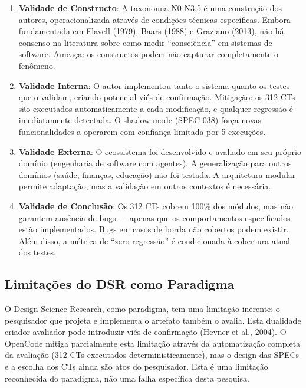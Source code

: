 \begin{enumerate}
    \item \textbf{Validade de Constructo}: A taxonomia N0-N3.5 é uma construção dos autores, operacionalizada através de condições técnicas específicas. Embora fundamentada em Flavell (1979), Baars (1988) e Graziano (2013), não há consenso na literatura sobre como medir ``consciência'' em sistemas de software. Ameaça: os constructos podem não capturar completamente o fenômeno.
    
    \item \textbf{Validade Interna}: O autor implementou tanto o sistema quanto os testes que o validam, criando potencial viés de confirmação. Mitigação: os 312 CTs são executados automaticamente a cada modificação, e qualquer regressão é imediatamente detectada. O shadow mode (SPEC-038) força novas funcionalidades a operarem com confiança limitada por 5 execuções.
    
    \item \textbf{Validade Externa}: O ecossistema foi desenvolvido e avaliado em seu próprio domínio (engenharia de software com agentes). A generalização para outros domínios (saúde, finanças, educação) não foi testada. A arquitetura modular permite adaptação, mas a validação em outros contextos é necessária.
    
    \item \textbf{Validade de Conclusão}: Os 312 CTs cobrem 100\% dos módulos, mas não garantem ausência de bugs — apenas que os comportamentos especificados estão implementados. Bugs em casos de borda não cobertos podem existir. Além disso, a métrica de ``zero regressão'' é condicionada à cobertura atual dos testes.
\end{enumerate}

\subsection{Limitações do DSR como Paradigma}

O Design Science Research, como paradigma, tem uma limitação inerente: o pesquisador que projeta e implementa o artefato também o avalia. Esta dualidade criador-avaliador pode introduzir viés de confirmação (Hevner et al., 2004). O OpenCode mitiga parcialmente esta limitação através da automatização completa da avaliação (312 CTs executados deterministicamente), mas o design das SPECs e a escolha dos CTs ainda são atos do pesquisador. Esta é uma limitação reconhecida do paradigma, não uma falha específica desta pesquisa.
